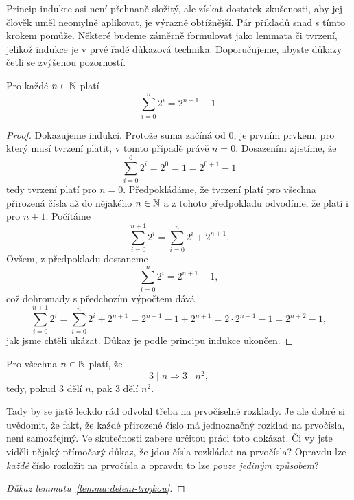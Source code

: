 Princip indukce asi není přehnaně složitý, ale získat dostatek zkušenosti, aby
jej člověk uměl neomylně aplikovat, je výrazně obtížnější. Pár příkladů snad s
tímto krokem pomůže. Některé budeme záměrně formulovat jako lemmata či tvrzení,
jelikož indukce je v prvé řadě důkazová technika. Doporučujeme, abyste důkazy
četli se zvýšenou pozorností.

\begin{lemma}
 Pro každé $n \in \mathbb{N}$ platí
 \[
  \sum_{i=0}^{n} 2^{i} = 2^{n+1} - 1.
 \]
\end{lemma}
\begin{proof}
 Dokazujeme indukcí. Protože suma začíná od $0$, je prvním prvkem, pro který
 musí tvrzení platit, v tomto případě právě $n = 0$. Dosazením zjistíme, že
 \[
  \sum_{i=0}^{0} 2^{i} = 2^{0} = 1 = 2^{0 + 1} - 1
 \]
 tedy tvrzení platí pro $n = 0$. Předpokládáme, že tvrzení platí pro všech\-na
 přirozená čísla až do nějakého $n \in \mathbb{N}$ a z tohoto předpokladu odvodíme, že
 platí i pro $n + 1$. Počítáme
 \[
  \sum_{i=0}^{n + 1} 2^{i} = \sum_{i=0}^{n} 2^{i} + 2^{n+1}.
 \]
 Ovšem, z předpokladu dostaneme
 \[
  \sum_{i=0}^{n} 2^{i} = 2^{n+1}-1,
 \]
 což dohromady s předchozím výpočtem dává
 \[
  \sum_{i=0}^{n + 1} 2^{i} = \sum_{i=0}^{n} 2^{i} + 2^{n+1} = 2^{n + 1} - 1 +
  2^{n+1} = 2 \cdot 2^{n+1} - 1 = 2^{n+2} - 1,
 \]
 jak jsme chtěli ukázat. Důkaz je podle principu indukce ukončen.
\end{proof}

\begin{lemma}
 \label{lemma:deleni-trojkou}
 Pro všechna $n \in \mathbb{N}$ platí, že
 \[
  3 \mid n \Rightarrow 3 \mid n^2,
 \]
 tedy, pokud $3$ dělí $n$, pak $3$ dělí $n^2$.
\end{lemma}
Tady by se jistě leckdo rád odvolal třeba na prvočíselné rozklady. Je ale dobré
si uvědomit, že fakt, že každé přirozené číslo má jednoznačný rozklad na
prvočísla, není samozřejmý. Ve skutečnosti zabere určitou práci toto dokázat. Či
vy jste viděli nějaký přímočarý důkaz, že jdou čísla rozkládat na prvočísla?
Opravdu lze \emph{každé} číslo rozložit na prvočísla a opravdu to lze
\emph{pouze jediným způsobem}?

\begin{proof}[Důkaz lemmatu~\ref{lemma:deleni-trojkou}]
\end{proof}
